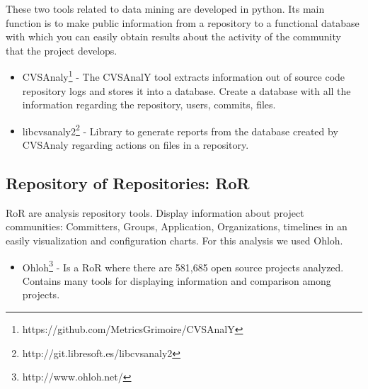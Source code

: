 \documentclass[11pt]{scrartcl}
\begin{document}
\par These two tools related to data mining are developed in python. Its main function is to make public information from a repository to a functional database with which you can easily obtain results about the activity of the community that the project develops.

\begin{itemize}
    \item CVSAnaly\footnote{https://github.com/MetricsGrimoire/CVSAnalY} - The CVSAnalY tool extracts information out of source code repository logs and stores it into a database. Create a database with all the information regarding the repository, users, commits, files.
    \item libcvsanaly2\footnote{http://git.libresoft.es/libcvsanaly2} - Library to generate reports from the database created by CVSAnaly regarding actions on files in a repository.
\end{itemize}

\subsection{Repository of Repositories: RoR}

RoR are analysis repository tools. Display information about project communities: Committers, Groups, Application, Organizations, timelines in an easily visualization and configuration charts. For this analysis we used Ohloh.

\begin{itemize}
    \item Ohloh\footnote{http://www.ohloh.net/} - Is a RoR where there are 581,685 open source projects analyzed. Contains many tools for displaying information and comparison among projects.
\end{itemize}
\end{document}
